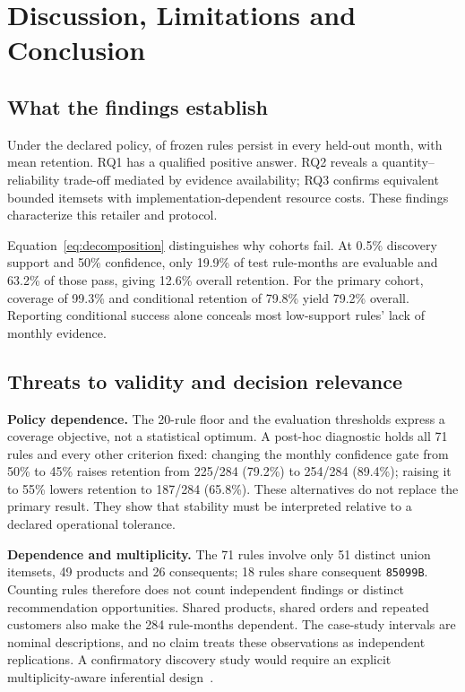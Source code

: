 
\section{Discussion, Limitations and Conclusion}
\subsection{What the findings establish}
Under the declared policy, \AllMonthsRules{} of \SelectedRules{} frozen rules persist in every held-out month, with \MeanRetention{} mean retention. RQ1 has a qualified positive answer. RQ2 reveals a quantity--reliability trade-off mediated by evidence availability; RQ3 confirms equivalent bounded itemsets with implementation-dependent resource costs. These findings characterize this retailer and protocol.

Equation~\ref{eq:decomposition} distinguishes why cohorts fail. At 0.5\% discovery support and 50\% confidence, only 19.9\% of test rule-months are evaluable and 63.2\% of those pass, giving 12.6\% overall retention. For the primary cohort, coverage of 99.3\% and conditional retention of 79.8\% yield 79.2\% overall. Reporting conditional success alone conceals most low-support rules' lack of monthly evidence.

\subsection{Threats to validity and decision relevance}
\textbf{Policy dependence.} The 20-rule floor and the evaluation thresholds express a coverage objective, not a statistical optimum. A post-hoc diagnostic holds all 71 rules and every other criterion fixed: changing the monthly confidence gate from 50\% to 45\% raises retention from 225/284 (79.2\%) to 254/284 (89.4\%); raising it to 55\% lowers retention to 187/284 (65.8\%). These alternatives do not replace the primary result. They show that stability must be interpreted relative to a declared operational tolerance.

\textbf{Dependence and multiplicity.} The 71 rules involve only 51 distinct union itemsets, 49 products and 26 consequents; 18 rules share consequent \texttt{85099B}. Counting rules therefore does not count independent findings or distinct recommendation opportunities. Shared products, shared orders and repeated customers also make the 284 rule-months dependent. The case-study intervals are nominal descriptions, and no claim treats these observations as independent replications. A confirmatory discovery study would require an explicit multiplicity-aware inferential design~\citep{hamalainen2019}.

